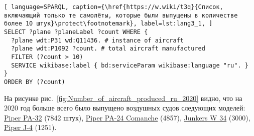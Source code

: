 \begin{lstlisting}[ language=SPARQL, caption={\href{https://w.wiki/t3q}{Список, включающий только те самолёты, которые были выпущены в количестве более 10 штук}\protect\footnotemark}, label=lst:lang3_1, ]
SELECT ?plane ?planeLabel ?count WHERE {
  ?plane wdt:P31 wd:Q11436. # instance of aircraft
  ?plane wdt:P1092 ?count. # total aircraft manufactured  
  FILTER (?count > 10)
  SERVICE wikibase:label { bd:serviceParam wikibase:language "ru". }
}
ORDER BY (?count)
\end{lstlisting}


\label{aircraft_question_2}

На рисунке рис.~\ref{fig:Number_of_aircraft_produced_ru_2020} видно, что на 2020 год больше всего было выпущено воздушных судов следующих моделей: \href{https://www.wikidata.org/wiki/Q2096452}{Piper PA-32} (\num{7842} штук), \href{https://www.wikidata.org/wiki/Q1860367}{Piper PA-24 Comanche} (\num{4857}), \href{https://www.wikidata.org/wiki/Q694521}{Junkers W 34} (\num{3000}), \href{https://www.wikidata.org/wiki/Q4046989}{Piper J-4} (\num{1251}).

\begin{figure*}[h]

    \setlength{\fboxsep}{0pt}%
    \setlength{\fboxrule}{1pt}%

	\caption{Количество выпущенных воздушных судов по моделям, 2020.}%
    \label{fig:Number_of_aircraft_produced_ru_2020}%
\end{figure*}

